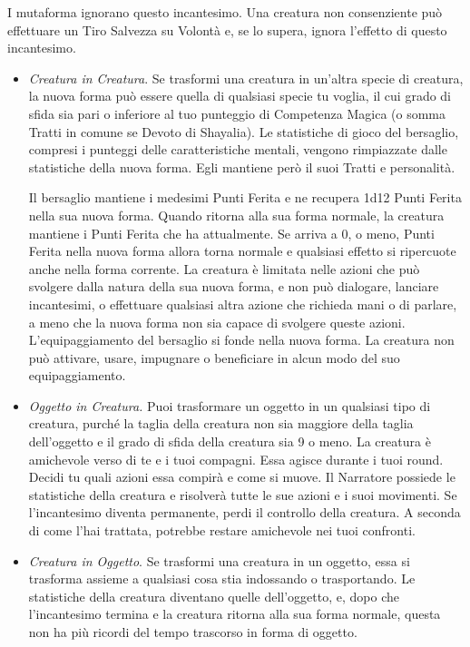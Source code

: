 \begin{multicols}{2}
I mutaforma ignorano questo incantesimo. Una creatura non consenziente può effettuare un Tiro Salvezza su Volontà e, se lo supera, ignora l'effetto di questo incantesimo.

\begin{itemize}[leftmargin=*] \setlength{\itemsep}{0pt}
	\item \emph{Creatura in Creatura}. Se trasformi una creatura in un'altra specie di creatura, la nuova forma può essere quella di qualsiasi specie tu voglia, il cui grado di sfida sia pari o inferiore al tuo punteggio di Competenza Magica (o somma Tratti in comune se Devoto di Shayalia). Le statistiche di gioco del bersaglio, compresi i punteggi delle caratteristiche mentali, vengono rimpiazzate dalle statistiche della nuova forma. Egli mantiene però il suoi Tratti e personalità.

	Il bersaglio mantiene i medesimi Punti Ferita e ne recupera 1d12 Punti Ferita nella sua nuova forma. Quando ritorna alla sua forma normale, la creatura mantiene i Punti Ferita che ha attualmente. Se arriva a 0, o meno, Punti Ferita nella nuova forma allora torna normale e qualsiasi effetto si ripercuote anche nella forma corrente. La creatura è limitata nelle azioni che può svolgere dalla natura della sua nuova forma, e non può dialogare, lanciare incantesimi, o effettuare qualsiasi altra azione che richieda mani o di parlare, a meno che la nuova forma non sia capace di svolgere queste azioni. L'equipaggiamento del bersaglio si fonde nella nuova forma. La creatura non può attivare, usare, impugnare o beneficiare in alcun modo del suo equipaggiamento.

	\item \emph{Oggetto in Creatura.} Puoi trasformare un oggetto in un qualsiasi tipo di creatura, purché la taglia della creatura non sia maggiore della taglia dell'oggetto e il grado di sfida della creatura sia 9 o meno. La creatura è amichevole verso di te e i tuoi compagni. Essa agisce durante i tuoi round. Decidi tu quali azioni essa compirà e come si muove. Il Narratore possiede le statistiche della creatura e risolverà tutte le sue azioni e i suoi movimenti.
	Se l'incantesimo diventa permanente, perdi il controllo della creatura. A seconda di come l'hai trattata, potrebbe restare amichevole nei tuoi confronti.

	\item \emph{Creatura in Oggetto}. Se trasformi una creatura in un oggetto, essa si trasforma assieme a qualsiasi cosa stia indossando o trasportando. Le statistiche della creatura diventano quelle dell'oggetto, e, dopo che l'incantesimo termina e la creatura ritorna alla sua forma normale, questa non ha più ricordi del tempo trascorso in forma di oggetto.


\end{itemize}
\end{multicols}
